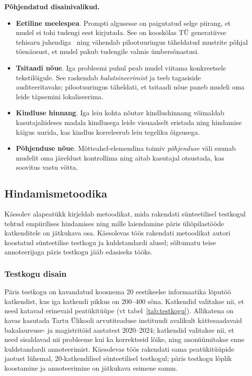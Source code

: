 \textbf{Põhjendatud disainivalikud.}
\begin{itemize}
    \item \textbf{Eetiline meelespea}. Prompti algusesse on paigutatud selge piirang, et mudel ei tohi tudengi eest kirjutada. See on kooskõlas TÜ generatiivse tehisaru juhendiga~\cite{ut_genAI_2024} ning vähendab pilootuuringus täheldatud mustrite põhjal tõenäosust, et mudel pakub tudengile valmis ümbersõnastusi.
    \item \textbf{Tsitaadi nõue}. Iga probleemi puhul peab mudel viitama konkreetsele tekstilõigule. See raskendab \emph{halutsineerimist} ja teeb tagasiside auditeeritavaks; pilootuuringus täheldati, et tsitaadi nõue paneb mudeli oma leide täpsemini lokaliseerima.
    \item \textbf{Kindluse hinnang}. Iga leiu kohta nõutav kindlushinnang võimaldab kasutajaliideses madala kindlusega leide visuaalselt eristada ning hindamise käigus uurida, kas kindlus korreleerub leiu tegeliku õigsusega.
    \item \textbf{Põhjenduse nõue}. Mõtteahel-elemendina toimiv \emph{põhjenduse} väli suunab mudelit oma järeldust kontrollima ning aitab kasutajal otsustada, kas soovitus vastu võtta.
\end{itemize}

\subsection{Hindamismetoodika} \label{metoodika:hindamine}

Käesolev alapeatükk kirjeldab metoodikat, mida rakendati sünteetilisel testkogul tehtud empiirilises hindamises ning mille laiendamine päris üliõpilastööde katkenditele on jätkukava osa. Käesolevas töös rakendati metoodikat autori koostatud sünteetilise testkogu ja kuldstandardi alusel; sõltumatu teise annoteerijaga päris testkogu jääb edasiseks tööks.

\subsubsection{Testkogu disain}

Päris testkogu on kavandatud koosnema 20 eestikeelse informaatika lõputöö katkendist, kus iga katkendi pikkus on 200--400 sõna. Katkendid valitakse nii, et need katavad erinevaid peatükitüüpe (vt tabel~\ref{tab:testkogu}). Allikatena on kavas kasutada Tartu Ülikooli arvutiteaduse instituudi avalikult kättesaadavaid bakalaureuse- ja magistritöid aastatest 2020--2024; katkendid valitakse nii, et need sisaldavad nii probleeme kui ka korrektseid lõike, ning anonüümitakse enne kuldstandardi annoteerimist. Käesolevas töös rakendati sama peatükitüüpide jaotust lühemal, 20-katkendilisel sünteetilisel testkogul; päris testkogu lõplik koostamine ja annoteerimine on jätkukava esimene samm.

